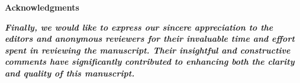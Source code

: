 \documentclass[12pt,technote,onecolumn]{IEEEtran}
\begin{document}
\vspace{10mm}


\begin{center}
    {\large \textbf{Acknowledgments}} \\[3mm]
    \begin{minipage}{0.9\textwidth}
   \textit{  \textbf{Finally, we would like to express our sincere appreciation to the editors and anonymous reviewers for their invaluable time and effort spent in reviewing the manuscript. Their insightful and constructive comments have significantly contributed to enhancing both the clarity and quality of this manuscript.}}
    \end{minipage}
\end{center}
\vspace{4mm}

\newpage
\clearpage
\begingroup
\let\uline\relax
\endgroup
\end{document}
